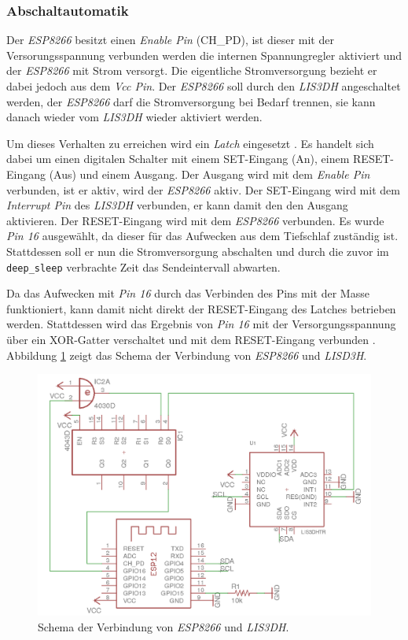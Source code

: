 \subsubsection{Abschaltautomatik}
\label{ch:Beschleunigungssensor:sec:Abschaltautomatik}
Der \emph{ESP8266} besitzt einen \emph{Enable Pin} (CH\_PD), ist dieser mit der Versorungsspannung verbunden werden die internen Spannungregler aktiviert und der \emph{ESP8266} mit Strom versorgt.
Die eigentliche Stromversorgung bezieht er dabei jedoch aus dem \emph{Vcc Pin}.
Der \emph{ESP8266} soll durch den \emph{LIS3DH} angeschaltet werden, der \emph{ESP8266} darf die Stromversorgung bei Bedarf trennen, sie kann danach wieder vom \emph{LIS3DH} wieder aktiviert werden. 

Um dieses Verhalten zu erreichen wird ein \emph{Latch} eingesetzt \cite{texas2003latch}.
Es handelt sich dabei um einen digitalen Schalter mit einem SET-Eingang (An), einem RESET-Eingang (Aus) und einem Ausgang.
Der Ausgang wird mit dem \emph{Enable Pin} verbunden, ist er aktiv, wird der \emph{ESP8266} aktiv.
Der SET-Eingang wird mit dem \emph{Interrupt Pin} des \emph{LIS3DH} verbunden, er kann damit den den Ausgang aktivieren.
Der RESET-Eingang wird mit dem \emph{ESP8266} verbunden. 
Es wurde \emph{Pin 16} ausgewählt, da dieser für das Aufwecken aus dem Tiefschlaf zuständig ist. 
Stattdessen soll er nun die Stromversorgung abschalten und durch die zuvor im \texttt{deep\_sleep} verbrachte Zeit das Sendeintervall abwarten.

Da das Aufwecken mit \emph{Pin 16} durch das Verbinden des Pins mit der Masse funktioniert, kann damit nicht direkt der RESET-Eingang des Latches betrieben werden.
Stattdessen wird das Ergebnis von \emph{Pin 16} mit der Versorgungsspannung über ein XOR-Gatter verschaltet und mit dem RESET-Eingang verbunden \cite{texas2014xor}.
Abbildung \ref{fig:schematics} zeigt das Schema der Verbindung von \emph{ESP8266} und \emph{LISD3H}.

\begin{figure}[h]
  \centering
	\includegraphics[width=\textwidth]{images/schematics.png}
  \caption{Schema der Verbindung von \emph{ESP8266} und \emph{LIS3DH}.}
  \label{fig:schematics}
\end{figure}

